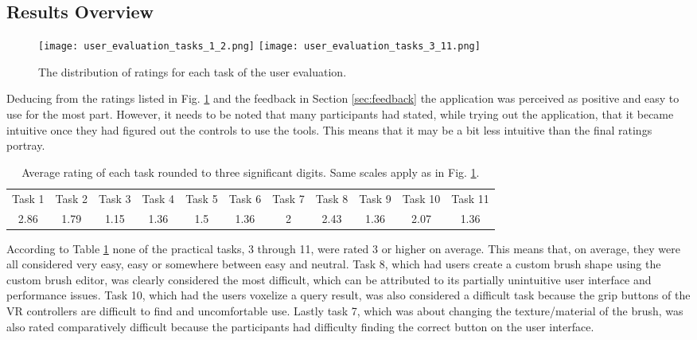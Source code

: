 \subsection{Results Overview}

\begin{figure}
\centering
\captionsetup{width=0.8\textwidth}
\texttt{[image: user\_evaluation\_tasks\_1\_2.png]}
\texttt{[image: user\_evaluation\_tasks\_3\_11.png]}
\caption{The distribution of ratings for each task of the user evaluation.}
\label{fig:user_evaluation_ratings}
\end{figure}

Deducing from the ratings listed in Fig. \ref{fig:user_evaluation_ratings} and the feedback in Section \ref{sec:feedback} the application was perceived as positive and easy to use for the most part. However, it needs to be noted that many participants had stated, while trying out the application, that it became intuitive once they had figured out the controls to use the tools. This means that it may be a bit less intuitive than the final ratings portray.

\begin{table}[ht]
\captionsetup{width=0.8\textwidth}
\caption{Average rating of each task rounded to three significant digits. Same scales apply as in Fig. \ref{fig:user_evaluation_ratings}.}
\centering
\footnotesize
\begin{tabular}{||c c c c c c c c c c c||}
	\hline
	Task 1 & Task 2 & Task 3 & Task 4 & Task 5 & Task 6 & Task 7 & Task 8 & Task 9 & Task 10 & Task 11\\ [0.5ex] \hhline{||===========||}
	2.86 & 1.79 & 1.15 & 1.36 & 1.5 & 1.36 & 2 & 2.43 & 1.36 & 2.07 & 1.36\\ 
	\hline
\end{tabular}
\label{table:user_evaluation_averages}
\end{table}

According to Table \ref{table:user_evaluation_averages} none of the practical tasks, 3 through 11, were rated 3 or higher on average. This means that, on average, they were all considered very easy, easy or somewhere between easy and neutral. Task 8, which had users create a custom brush shape using the custom brush editor, was clearly considered the most difficult, which can be attributed to its partially unintuitive user interface and performance issues. Task 10, which had the users voxelize a query result, was also considered a difficult task because the grip buttons of the VR controllers are difficult to find and uncomfortable use. Lastly task 7, which was about changing the texture/material of the brush, was also rated comparatively difficult because the participants had difficulty finding the correct button on the user interface.

